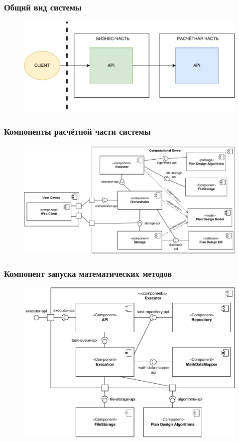 \begin{frame}
\frametitle{Общий вид системы}
\begin{figure}
    \includegraphics[scale=.9]{pictures/architecture/system}
\end{figure}
\end{frame}

\begin{frame}
\frametitle{Компоненты расчётной части системы}
\begin{figure}
    \includegraphics[scale=.6]{pictures/architecture/component}
\end{figure}
\end{frame}


\begin{frame}
\frametitle{Компонент запуска математических методов}
\begin{figure}
    \includegraphics[scale=.6]{pictures/architecture/executor_component_common}
\end{figure}
\end{frame}





